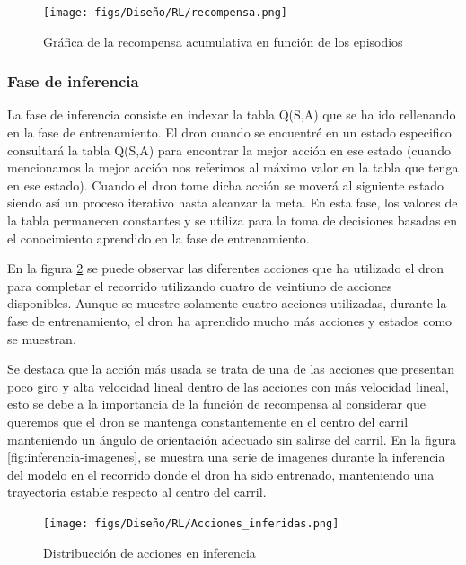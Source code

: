 \begin{figure} [H]
  \begin{center}
    \texttt{[image: figs/Diseño/RL/recompensa.png]}
  \end{center}
  \caption{Gráfica de la recompensa acumulativa en función de los episodios}
  \label{fig:recompensa}
\end{figure}

\subsubsection{Fase de inferencia}
\label{sec:fases_inferencia}
La fase de inferencia consiste en indexar la tabla Q(S,A) que se ha ido rellenando en la fase de entrenamiento. El dron cuando se encuentré en un estado especifico consultará la tabla Q(S,A) para
encontrar la mejor acción en ese estado (cuando mencionamos la mejor acción nos referimos al máximo valor en la tabla que tenga en ese estado). Cuando el dron tome dicha acción se moverá al siguiente estado
siendo así un proceso iterativo hasta alcanzar la meta. En esta fase, los valores de la tabla permanecen constantes y se utiliza para la toma de decisiones basadas en el conocimiento
aprendido en la fase de entrenamiento. \newline

En la figura \ref{fig:Distribucción_inferencia} se puede observar las diferentes acciones que ha utilizado el dron para completar el recorrido utilizando cuatro de veintiuno de acciones
disponibles. Aunque se muestre solamente cuatro acciones utilizadas, durante la fase de entrenamiento, el dron ha aprendido mucho más acciones y estados como se muestran. 

Se destaca que la acción más usada se trata de una de las acciones que presentan poco giro y alta velocidad lineal dentro de las acciones con más velocidad lineal, esto se debe
a la importancia de la función de recompensa al considerar que queremos que el dron se mantenga constantemente en el centro del carril manteniendo un ángulo de orientación adecuado
sin salirse del carril. En la figura \ref{fig:inferencia-imagenes}, se muestra una serie de imagenes durante la inferencia del modelo en el recorrido donde el dron ha sido entrenado, manteniendo una trayectoria 
estable respecto al centro del carril.

\begin{figure} [H]
  \begin{center}
    \texttt{[image: figs/Diseño/RL/Acciones\_inferidas.png]}
  \end{center}
  \caption{Distribucción de acciones en inferencia}
  \label{fig:Distribucción_inferencia}
\end{figure}

